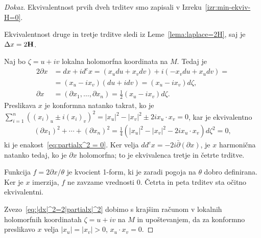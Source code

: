 \documentclass[12pt,a4paper,twoside]{article}
\theoremstyle{definition} %
\newenvironment{dokaz}[1][Dokaz]{\begin{proof}[#1]}{\end{proof}}
\theoremstyle{plain} %
\numberwithin{equation}{section}  %
\begin{document}
\begin{dokaz}
Ekvivalentnost prvih dveh trditev smo zapisali v Izreku~\ref{izr:min-ekviv-H=0}.

Ekvivalentnost druge in tretje trditve sledi iz Leme~\ref{lema:laplace=2H}, saj je $\Delta x = 2 \textbf{\textup{H}}$.

Naj bo $\zeta = u + iv$ lokalna holomorfna koordinata na $M$. Tedaj je
\begin{align*}
2\partial x &= dx + id^{c}x = (x_{u}du + x_{v}dv) + i(-x_{v}du + x_{u}dv) = \\ 
	&= (x_{u} - ix_{v})(du + idv) = (x_{u} - ix_{v})d\zeta, \\
\partial x  &= (\partial x_{1}, \dots , \partial x_{n}) = \frac{1}{2}  (x_{u} - ix_{v})d\zeta.
\end{align*}
Preslikava $x$ je konformna natanko takrat, ko je $\sum_{i=1}^{n} \left((x_{i})_{u} \pm i(x_{i})_{v}\right)^2 = |x_{u}|^2 - |x_{v}|^2 \pm 2ix_{u} \cdot x_{v} = 0$, kar je ekvivalentno 
\begin{align*}
(\partial x_1)^2 + \cdots + (\partial x_{n})^2 = \frac{1}{4} \left(|x_{u}|^2 - |x_{v}|^2 - 2ix_{u} \cdot x_{v} \right) d\zeta ^2 = 0,
\end{align*}
ki je enakost~\eqref{eq:partialx^2 = 0}. Ker velja $dd^{c}x = -2i \bar{\partial} (\partial x)$, je $x$ harmonična natanko tedaj, ko je $\partial x$ holomorfna; to je ekvivalenca tretje in četrte trditve.

Funkcija $f = 2 \partial x / \theta$ je kvocient 1-form, ki je zaradi pogoja na $\theta$ dobro definirana. Ker je $x$ imerzija, $f$ ne zavzame vrednosti $0$. Četrta in peta trditev sta očitno ekvivalentni.

Zvezo~\eqref{eq:|dx|^2=2|partialx|^2} dobimo s krajšim računom v lokalnih holomorfnih koordinatah $\zeta = u + iv$ na $M$ in upoštevanjem, da za konformno preslikavo $x$ velja $|x_{u}|=|x_{v}|>0$, $x_{u} \cdot x_{v} = 0$.
\end{dokaz}
\end{document}
